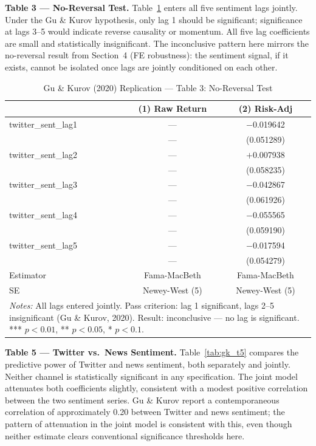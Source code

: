 \documentclass[12pt]{article}
\begin{document}
\textbf{Table 3 --- No-Reversal Test.} Table~\ref{tab:gk_t3} enters all five sentiment lags jointly. Under the Gu \& Kurov hypothesis, only lag 1 should be significant; significance at lags 3--5 would indicate reverse causality or momentum. All five lag coefficients are small and statistically insignificant. The inconclusive pattern here mirrors the no-reversal result from Section~4 (FE robustness): the sentiment signal, if it exists, cannot be isolated once lags are jointly conditioned on each other.

\begin{table}[htbp]
\centering
\caption{Gu \& Kurov (2020) Replication --- Table 3: No-Reversal Test}
\label{tab:gk_t3}
\begin{tabular}{lcc}
\hline\hline
 & (1) Raw Return & (2) Risk-Adj \\
\hline
twitter\_sent\_lag1 & --- & $-$0.019642 \\
 & --- & (0.051289) \\
twitter\_sent\_lag2 & --- & $+$0.007938 \\
 & --- & (0.058235) \\
twitter\_sent\_lag3 & --- & $-$0.042867 \\
 & --- & (0.061926) \\
twitter\_sent\_lag4 & --- & $-$0.055565 \\
 & --- & (0.059190) \\
twitter\_sent\_lag5 & --- & $-$0.017594 \\
 & --- & (0.054279) \\
\hline
Estimator & Fama-MacBeth & Fama-MacBeth \\
SE & Newey-West (5) & Newey-West (5) \\
\hline\hline
\multicolumn{3}{p{0.9\linewidth}}{\footnotesize \textit{Notes:} All lags entered jointly. Pass criterion: lag 1 significant, lags 2--5 insignificant (Gu \& Kurov, 2020). Result: inconclusive --- no lag is significant. *** $p<0.01$, ** $p<0.05$, * $p<0.1$.}
\end{tabular}
\end{table}

\textbf{Table 5 --- Twitter vs.\ News Sentiment.} Table~\ref{tab:gk_t5} compares the predictive power of Twitter and news sentiment, both separately and jointly. Neither channel is statistically significant in any specification. The joint model attenuates both coefficients slightly, consistent with a modest positive correlation between the two sentiment series. Gu \& Kurov report a contemporaneous correlation of approximately 0.20 between Twitter and news sentiment; the pattern of attenuation in the joint model is consistent with this, even though neither estimate clears conventional significance thresholds here.
\end{document}
